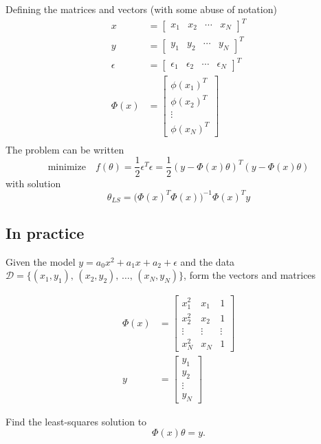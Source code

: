 \documentclass[a4paper]{scrartcl}
\begin{document}
Defining the matrices and vectors (with some abuse of notation)
\begin{align*}
  x &= \begin{bmatrix} x_1 & x_2 & \cdots & x_N \end{bmatrix}^T\\
  y &= \begin{bmatrix} y_1 & y_2 & \cdots & y_N \end{bmatrix}^T\\
  \epsilon &= \begin{bmatrix} \epsilon_1 & \epsilon_2 & \cdots & \epsilon_N \end{bmatrix}^T\\
  \Phi(x) &= \begin{bmatrix} \phi(x_1)^T\\\phi(x_2)^T\\\vdots\\\phi(x_N)^T\end{bmatrix}\\
\end{align*}
The problem can be written 
\[
\text{minimize}\quad  f(\theta) = \frac{1}{2}\epsilon^T\epsilon = \frac{1}{2}(y -\Phi(x)\theta)^T(y-\Phi(x)\theta)\]
with solution
\[ \theta_{LS} = \Big( \Phi(x)^T\Phi(x) \Big)^{-1} \Phi(x)^T y\]

\subsection{In practice}
\label{sec:org8566269}
Given the model \(y = a_0x^2 + a_1x + a_2 + \epsilon\) and the data \(\mathcal{D} = \{ (x_1, y_1),\, (x_2, y_2),\, \ldots, \, (x_N, y_N) \}\), form the vectors and matrices

\begin{align*}
\Phi(x) &= \begin{bmatrix} x_1^2 & x_1 & 1\\x_2^2 & x_2 & 1\\\vdots & \vdots & \vdots\\x_N^2 & x_N & 1\end{bmatrix} \\
y &= \begin{bmatrix}y_1\\y_2\\\vdots\\y_N\end{bmatrix}
\end{align*}

Find the least-squares solution to 
\[ \Phi(x)\theta = y.\]
\end{document}
